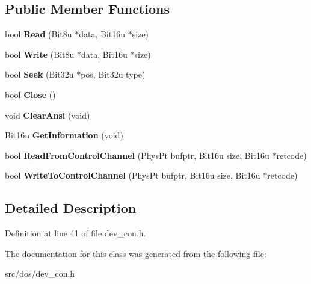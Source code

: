\subsection*{Public Member Functions}
\begin{DoxyCompactItemize}
\item 
\hypertarget{classdevice__CON_a748000d06f15adcb17f329e32eda83fb}{bool {\bfseries Read} (Bit8u $\ast$data, Bit16u $\ast$size)}\label{classdevice__CON_a748000d06f15adcb17f329e32eda83fb}

\item 
\hypertarget{classdevice__CON_ab628c60cb04eafd473ffed97a8287bd3}{bool {\bfseries Write} (Bit8u $\ast$data, Bit16u $\ast$size)}\label{classdevice__CON_ab628c60cb04eafd473ffed97a8287bd3}

\item 
\hypertarget{classdevice__CON_a6d744c09531d7691b538a7f13b3cef7a}{bool {\bfseries Seek} (Bit32u $\ast$pos, Bit32u type)}\label{classdevice__CON_a6d744c09531d7691b538a7f13b3cef7a}

\item 
\hypertarget{classdevice__CON_a69784b10d975098ba5fd46dc4cf33593}{bool {\bfseries Close} ()}\label{classdevice__CON_a69784b10d975098ba5fd46dc4cf33593}

\item 
\hypertarget{classdevice__CON_acf82cb98642a058ba380f15492cb8833}{void {\bfseries Clear\-Ansi} (void)}\label{classdevice__CON_acf82cb98642a058ba380f15492cb8833}

\item 
\hypertarget{classdevice__CON_a8db295befbc8bf8ba25504e65241a4fe}{Bit16u {\bfseries Get\-Information} (void)}\label{classdevice__CON_a8db295befbc8bf8ba25504e65241a4fe}

\item 
\hypertarget{classdevice__CON_aed3d4935317137834c51fbba69221c8f}{bool {\bfseries Read\-From\-Control\-Channel} (Phys\-Pt bufptr, Bit16u size, Bit16u $\ast$retcode)}\label{classdevice__CON_aed3d4935317137834c51fbba69221c8f}

\item 
\hypertarget{classdevice__CON_a6b8675aaab24d4ceeed07a669b8bb512}{bool {\bfseries Write\-To\-Control\-Channel} (Phys\-Pt bufptr, Bit16u size, Bit16u $\ast$retcode)}\label{classdevice__CON_a6b8675aaab24d4ceeed07a669b8bb512}

\end{DoxyCompactItemize}


\subsection{Detailed Description}


Definition at line 41 of file dev\-\_\-con.\-h.



The documentation for this class was generated from the following file\-:\begin{DoxyCompactItemize}
\item 
src/dos/dev\-\_\-con.\-h\end{DoxyCompactItemize}
